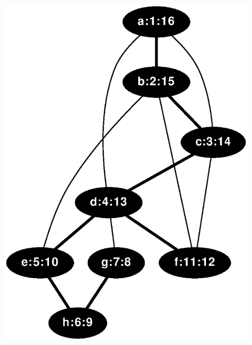 \documentclass{article}
\begin{document}
\includegraphics[height=.3\textheight]{dfs_undirected_classroom_16.eps}
\vspace{1em}
\HR
\end{document}
